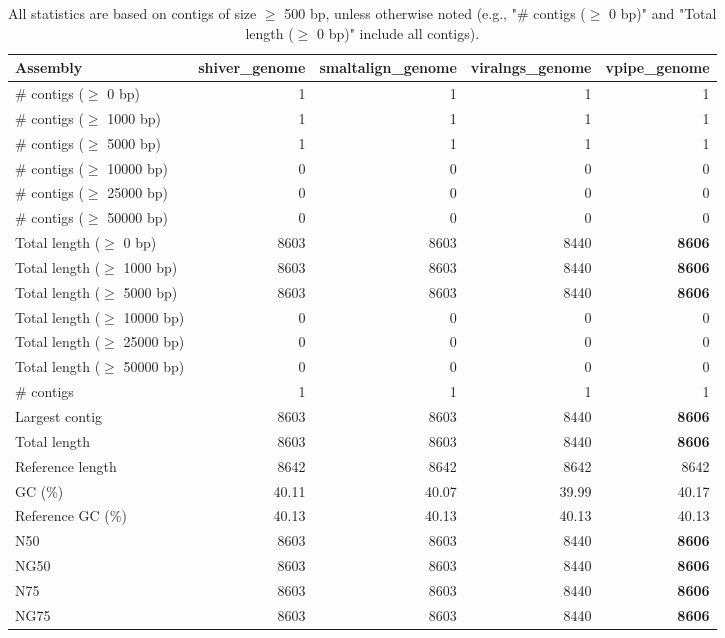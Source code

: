 \documentclass[12pt,a4paper]{article}
\begin{document}
\begin{table}[ht]
\begin{center}
\caption{All statistics are based on contigs of size $\geq$ 500 bp, unless otherwise noted (e.g., "\# contigs ($\geq$ 0 bp)" and "Total length ($\geq$ 0 bp)" include all contigs).}
\begin{tabular}{|l*{4}{|r}|}
\hline
Assembly & shiver\_genome & smaltalign\_genome & viralngs\_genome & vpipe\_genome \\ \hline
\# contigs ($\geq$ 0 bp) & 1 & 1 & 1 & 1 \\ \hline
\# contigs ($\geq$ 1000 bp) & 1 & 1 & 1 & 1 \\ \hline
\# contigs ($\geq$ 5000 bp) & 1 & 1 & 1 & 1 \\ \hline
\# contigs ($\geq$ 10000 bp) & 0 & 0 & 0 & 0 \\ \hline
\# contigs ($\geq$ 25000 bp) & 0 & 0 & 0 & 0 \\ \hline
\# contigs ($\geq$ 50000 bp) & 0 & 0 & 0 & 0 \\ \hline
Total length ($\geq$ 0 bp) & 8603 & 8603 & 8440 & {\bf 8606} \\ \hline
Total length ($\geq$ 1000 bp) & 8603 & 8603 & 8440 & {\bf 8606} \\ \hline
Total length ($\geq$ 5000 bp) & 8603 & 8603 & 8440 & {\bf 8606} \\ \hline
Total length ($\geq$ 10000 bp) & 0 & 0 & 0 & 0 \\ \hline
Total length ($\geq$ 25000 bp) & 0 & 0 & 0 & 0 \\ \hline
Total length ($\geq$ 50000 bp) & 0 & 0 & 0 & 0 \\ \hline
\# contigs & 1 & 1 & 1 & 1 \\ \hline
Largest contig & 8603 & 8603 & 8440 & {\bf 8606} \\ \hline
Total length & 8603 & 8603 & 8440 & {\bf 8606} \\ \hline
Reference length & 8642 & 8642 & 8642 & 8642 \\ \hline
GC (\%) & 40.11 & 40.07 & 39.99 & 40.17 \\ \hline
Reference GC (\%) & 40.13 & 40.13 & 40.13 & 40.13 \\ \hline
N50 & 8603 & 8603 & 8440 & {\bf 8606} \\ \hline
NG50 & 8603 & 8603 & 8440 & {\bf 8606} \\ \hline
N75 & 8603 & 8603 & 8440 & {\bf 8606} \\ \hline
NG75 & 8603 & 8603 & 8440 & {\bf 8606} \\ \hline

\end{tabular}
\end{center}
\end{table}
\end{document}
